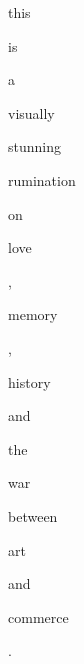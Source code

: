 \documentclass[varwidth]{standalone}
\begin{document}
\begin{CJK*}{UTF8}{gbsn}
{\setlength{\fboxsep}{0pt}\colorbox{white!0}{\parbox{0.9\textwidth}{
\colorbox{red!40.0}{\strut this} \colorbox{red!85.0}{\strut is} \colorbox{red!75.0}{\strut a} \colorbox{red!95.0}{\strut visually} \colorbox{red!90.0}{\strut stunning} \colorbox{red!65.0}{\strut rumination} \colorbox{red!80.0}{\strut on} \colorbox{red!20.0}{\strut love} \colorbox{red!10.0}{\strut ,} \colorbox{red!70.0}{\strut memory} \colorbox{red!15.0}{\strut ,} \colorbox{red!50.0}{\strut history} \colorbox{red!45.0}{\strut and} \colorbox{red!60.0}{\strut the} \colorbox{red!25.0}{\strut war} \colorbox{red!30.0}{\strut between} \colorbox{red!55.0}{\strut art} \colorbox{red!5.0}{\strut and} \colorbox{red!35.0}{\strut commerce} \colorbox{red!0.0}{\strut .} 
}}}
\end{CJK*}
\end{document}
